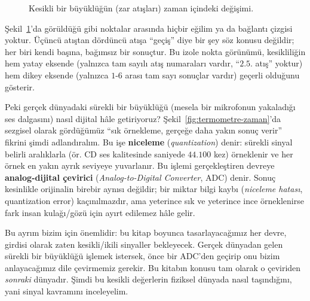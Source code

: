 \begin{figure}[H]
\centering
{}
\caption{Kesikli bir büyüklüğün (zar atışları) zaman içindeki değişimi.}
\label{fig:zar-zaman}
\end{figure}

Şekil~\ref{fig:zar-zaman}'da görüldüğü gibi noktalar arasında hiçbir eğilim ya da bağlantı
çizgisi yoktur. Üçüncü atıştan dördüncü atışa ``geçiş'' diye bir şey söz konusu değildir; her
biri kendi başına, bağımsız bir sonuçtur. Bu izole nokta görünümü, kesikliliğin hem yatay
eksende (yalnızca tam sayılı atış numaraları vardır, ``$2.5$. atış'' yoktur) hem dikey eksende
(yalnızca $1$-$6$ arası tam sayı sonuçlar vardır) geçerli olduğunu gösterir.

Peki gerçek dünyadaki sürekli bir büyüklüğü (mesela bir mikrofonun yakaladığı ses dalgasını)
nasıl dijital hâle getiriyoruz? Şekil~\ref{fig:termometre-zaman}'da sezgisel olarak gördüğümüz
``sık örnekleme, gerçeğe daha yakın sonuç verir'' fikrini şimdi adlandıralım. Bu işe
\textbf{niceleme}
(\emph{quantization}) denir: sürekli sinyal belirli aralıklarla (ör. CD ses kalitesinde
saniyede $44{.}100$ kez) örneklenir ve her örnek en yakın ayrık seviyeye yuvarlanır. Bu
işlemi gerçekleştiren devreye \textbf{analog-dijital çevirici} (\emph{Analog-to-Digital Converter}, ADC) denir. Sonuç kesinlikle orijinalin birebir
aynısı değildir; bir miktar bilgi kaybı (\emph{niceleme hatası}, quantization error)
kaçınılmazdır, ama yeterince sık ve yeterince ince örneklenirse fark insan kulağı/gözü için
ayırt edilemez hâle gelir.

Bu ayrım bizim için önemlidir: bu kitap boyunca tasarlayacağımız her devre, girdisi olarak
zaten kesikli/ikili sinyaller bekleyecek. Gerçek dünyadan gelen sürekli bir büyüklüğü işlemek
istersek, önce bir ADC'den geçirip onu bizim anlayacağımız dile çevirmemiz gerekir. Bu
kitabın konusu tam olarak o çeviriden \emph{sonraki} dünyadır. Şimdi bu kesikli değerlerin
fiziksel dünyada nasıl taşındığını, yani sinyal kavramını inceleyelim.

